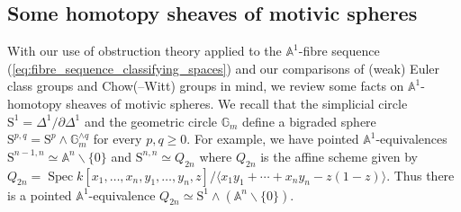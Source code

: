 \documentclass[11pt,leqno]{amsart}
\newcommand{\Spec}{\operatorname{Spec}}
\newcommand{\GW}{\mathbf{GW}}
\renewcommand{\1}{{\rm 1\hspace*{-0.4ex}%
\rule{0.1ex}{1.52ex}\hspace*{0.2ex}}}
\newcommand{\K}{{{\mathbf K}}}
\newcommand{\KMW}{\K^{\mathrm{MW}}}
\newcommand{\Hr}{{\mathrm {H}}}
\newcommand{\<}[1]{{\langle}#1 {\rangle}}
\newcommand{\Er}{\mathrm{E}}
\newcommand{\Sr}{\mathrm{S}}
\newcommand{\Abb}{\mathbb{A}}
\theoremstyle{plain}
\theoremstyle{definition}
\theoremstyle{remark}
\numberwithin{equation}{section}
\begin{document}
%
%
%

\subsection{Some homotopy sheaves of motivic spheres}

With our use of obstruction theory applied to the $\Abb^1$-fibre sequence (\ref{eq:fibre_sequence_classifying_spaces}) and our comparisons of (weak) Euler class groups and Chow(--Witt) groups in mind, we review some facts on $\Abb^1$-homotopy sheaves of motivic spheres. We recall that the simplicial circle $\Sr^1=\Delta^1/\partial\Delta^1$ and the geometric circle $\mathbb{G}_m$ define a bigraded sphere $\Sr^{p,q}=\Sr^p\wedge\mathbb G_m^{\wedge q}$ for every $p,q\geq 0$. For example, we have pointed $\Abb^1$-equivalences $\Sr^{n-1,n}\simeq\Abb^n\smallsetminus \{0\}$ \cite[§3, Example 2.20]{morelA1homotopyTheorySchemes1999} and $\Sr^{n,n}\simeq Q_{2n}$ \cite[Theorem 2.2.5]{asokSmoothModelsMotivic2017} where $Q_{2n}$ is the affine scheme given by $Q_{2n}=\Spec k[x_1,\ldots,x_n,y_1,\ldots,y_n,z]/\langle x_1y_1+\cdots+x_ny_n-z(1-z)\rangle$. Thus there is a pointed $\Abb^1$-equivalence $Q_{2n}\simeq\Sr^1\wedge(\Abb^n\smallsetminus \{0\})$.
\end{document}
